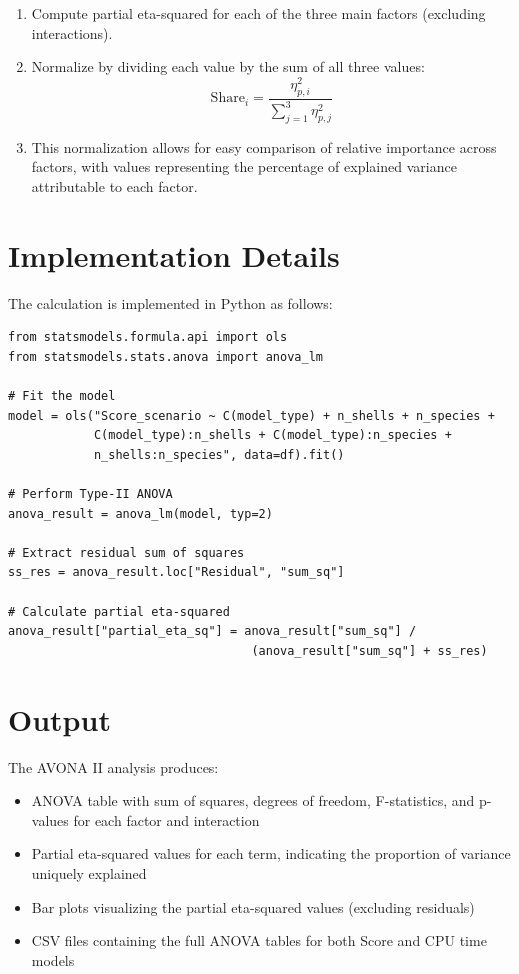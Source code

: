 \documentclass[11pt]{article}
\begin{document}
\begin{enumerate}
    \item Compute partial eta-squared for each of the three main factors (excluding interactions).
    
    \item Normalize by dividing each value by the sum of all three values:
    \begin{equation}
    \text{Share}_i = \frac{\eta_{p,i}^2}{\sum_{j=1}^{3} \eta_{p,j}^2}
    \end{equation}
    
    \item This normalization allows for easy comparison of relative importance across factors, with values representing the percentage of explained variance attributable to each factor.
\end{enumerate}

\section{Implementation Details}

The calculation is implemented in Python as follows:

\begin{verbatim}
from statsmodels.formula.api import ols
from statsmodels.stats.anova import anova_lm

# Fit the model
model = ols("Score_scenario ~ C(model_type) + n_shells + n_species + 
            C(model_type):n_shells + C(model_type):n_species + 
            n_shells:n_species", data=df).fit()

# Perform Type-II ANOVA
anova_result = anova_lm(model, typ=2)

# Extract residual sum of squares
ss_res = anova_result.loc["Residual", "sum_sq"]

# Calculate partial eta-squared
anova_result["partial_eta_sq"] = anova_result["sum_sq"] / 
                                  (anova_result["sum_sq"] + ss_res)
\end{verbatim}

\section{Output}

The AVONA II analysis produces:
\begin{itemize}
    \item ANOVA table with sum of squares, degrees of freedom, F-statistics, and p-values for each factor and interaction
    \item Partial eta-squared values for each term, indicating the proportion of variance uniquely explained
    \item Bar plots visualizing the partial eta-squared values (excluding residuals)
    \item CSV files containing the full ANOVA tables for both Score and CPU time models
\end{itemize}
\end{document}
